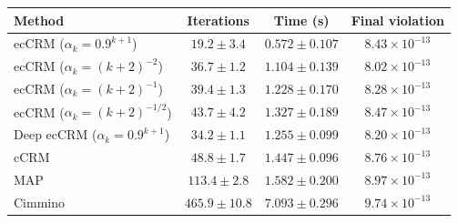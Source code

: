 \begin{tabular}{lccc}
\toprule
Method & Iterations & Time (s) & Final violation \\
\midrule
ecCRM ($\alpha_k=0.9^{k+1}$) & $\mathbf{19.2 \pm 3.4}$ & $\mathbf{0.572 \pm 0.107}$ & $8.43 \times 10^{-13}$ \\
ecCRM ($\alpha_k=(k+2)^{-2}$) & $36.7 \pm 1.2$ & $1.104 \pm 0.139$ & $8.02 \times 10^{-13}$ \\
ecCRM ($\alpha_k=(k+2)^{-1}$) & $39.4 \pm 1.3$ & $1.228 \pm 0.170$ & $8.28 \times 10^{-13}$ \\
ecCRM ($\alpha_k=(k+2)^{-1/2}$) & $43.7 \pm 4.2$ & $1.327 \pm 0.189$ & $8.47 \times 10^{-13}$ \\
Deep ecCRM ($\alpha_k=0.9^{k+1}$) & $34.2 \pm 1.1$ & $1.255 \pm 0.099$ & $8.20 \times 10^{-13}$ \\
cCRM & $48.8 \pm 1.7$ & $1.447 \pm 0.096$ & $8.76 \times 10^{-13}$ \\
MAP & $113.4 \pm 2.8$ & $1.582 \pm 0.200$ & $8.97 \times 10^{-13}$ \\
Cimmino & $465.9 \pm 10.8$ & $7.093 \pm 0.296$ & $9.74 \times 10^{-13}$ \\
\bottomrule
\end{tabular}
